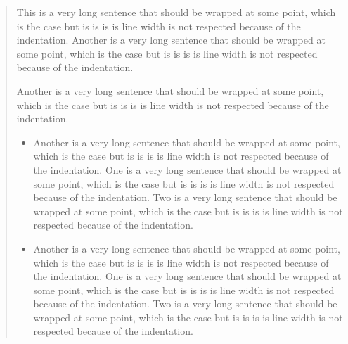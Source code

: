 \begin{abstract}
	This is a very long sentence that
	should be wrapped at some point,
	which is the case but is is is is
	line width is not respected because
	of the indentation.
	Another is a very long sentence
	that should be wrapped at some
	point, which is the case but is is
	is is line width is not respected
	because of the indentation.
	\begin{another}
		Another is a very long
		sentence that should be wrapped
		at some point, which is the
		case but is is is is line width
		is not respected because of the
		indentation.
		\begin{itemize}
			\item
			      Another is a very
			      long sentence that
			      should be wrapped at
			      some point, which is
			      the case but is is is
			      is line width is not
			      respected because of
			      the indentation.
			      One is a very long
			      sentence that should
			      be wrapped at some
			      point, which is the
			      case but is is is is
			      line width is not
			      respected because of
			      the indentation.
			      Two is a very long
			      sentence that should
			      be wrapped at some
			      point, which is the
			      case but is is is is
			      line width is not
			      respected because of
			      the indentation.
			\item
			      Another is a very
			      long sentence that
			      should be wrapped at
			      some point, which is
			      the case but is is is
			      is line width is not
			      respected because of
			      the indentation.
			      One is a very long
			      sentence that should
			      be wrapped at some
			      point, which is the
			      case but is is is is
			      line width is not
			      respected because of
			      the indentation.
			      Two is a very long
			      sentence that should
			      be wrapped at some
			      point, which is the
			      case but is is is is
			      line width is not
			      respected because of
			      the indentation.

\end{itemize}
\end{another}
\end{abstract}
